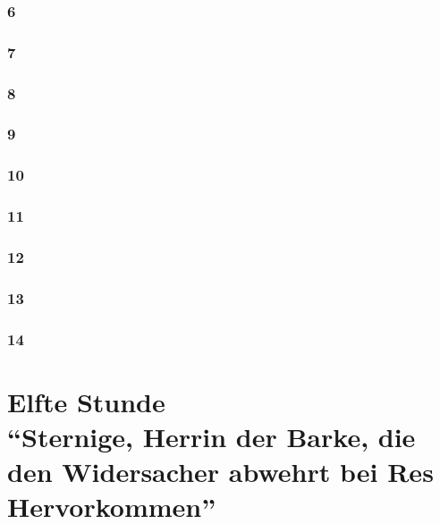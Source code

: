 \documentclass[11pt,titlepage,a5paper]{book}
\begin{document}
\section*{6}

\section*{7}

\section*{8}

\section*{9}

\section*{10}

\section*{11}

\section*{12}

\section*{13}

\section*{14}

\part*{Elfte Stunde\\"`Sternige, Herrin der Barke, die den Widersacher abwehrt bei Res Hervorkommen"'}
\end{document}

